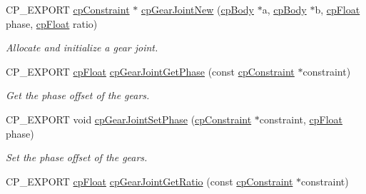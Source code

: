 \begin{DoxyCompactItemize}
\mbox{\label{group__cp_gear_joint_ga318fe157140b0272e7677351c7f7a96a}} 
C\+P\+\_\+\+E\+X\+P\+O\+RT \mbox{\hyperlink{structcp_constraint}{cp\+Constraint}} $\ast$ \mbox{\hyperlink{group__cp_gear_joint_ga318fe157140b0272e7677351c7f7a96a}{cp\+Gear\+Joint\+New}} (\mbox{\hyperlink{structcp_body}{cp\+Body}} $\ast$a, \mbox{\hyperlink{structcp_body}{cp\+Body}} $\ast$b, \mbox{\hyperlink{group__basic_types_gac1ed65573e035bf892505768c852d8d3}{cp\+Float}} phase, \mbox{\hyperlink{group__basic_types_gac1ed65573e035bf892505768c852d8d3}{cp\+Float}} ratio)
\begin{DoxyCompactList}\small\item\em Allocate and initialize a gear joint. \end{DoxyCompactList}\item 
\mbox{\label{group__cp_gear_joint_ga48c460709467b86a7e3209bfdcfca6a0}} 
C\+P\+\_\+\+E\+X\+P\+O\+RT \mbox{\hyperlink{group__basic_types_gac1ed65573e035bf892505768c852d8d3}{cp\+Float}} \mbox{\hyperlink{group__cp_gear_joint_ga48c460709467b86a7e3209bfdcfca6a0}{cp\+Gear\+Joint\+Get\+Phase}} (const \mbox{\hyperlink{structcp_constraint}{cp\+Constraint}} $\ast$constraint)
\begin{DoxyCompactList}\small\item\em Get the phase offset of the gears. \end{DoxyCompactList}\item 
\mbox{\label{group__cp_gear_joint_gabdbf2950090d65df36ffff002d6e929d}} 
C\+P\+\_\+\+E\+X\+P\+O\+RT void \mbox{\hyperlink{group__cp_gear_joint_gabdbf2950090d65df36ffff002d6e929d}{cp\+Gear\+Joint\+Set\+Phase}} (\mbox{\hyperlink{structcp_constraint}{cp\+Constraint}} $\ast$constraint, \mbox{\hyperlink{group__basic_types_gac1ed65573e035bf892505768c852d8d3}{cp\+Float}} phase)
\begin{DoxyCompactList}\small\item\em Set the phase offset of the gears. \end{DoxyCompactList}\item 
\mbox{\label{group__cp_gear_joint_ga2eedbb00537bc98ec8eea4bf1b3439b6}} 
C\+P\+\_\+\+E\+X\+P\+O\+RT \mbox{\hyperlink{group__basic_types_gac1ed65573e035bf892505768c852d8d3}{cp\+Float}} \mbox{\hyperlink{group__cp_gear_joint_ga2eedbb00537bc98ec8eea4bf1b3439b6}{cp\+Gear\+Joint\+Get\+Ratio}} (const \mbox{\hyperlink{structcp_constraint}{cp\+Constraint}} $\ast$constraint)

\end{DoxyCompactItemize}
